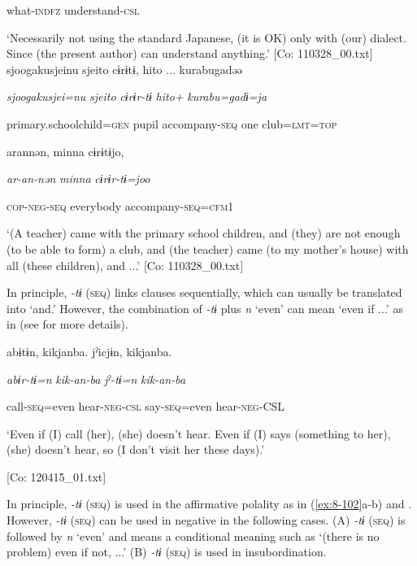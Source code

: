       what-\textsc{indfz}  understand-\textsc{csl}

\glt ‘Necessarily not using the standard Japanese, (it is OK) only with (our) dialect. Since (the present author) can understand anything.’ [Co: 110328\_00.txt]
\ex {\TM}
\glll  {\textbar}sjoogakusjei{\textbar}nu  {\textbar}sjeito{\textbar}  cɨrɨtɨ,  {\textbar}hito ...  kurabu{\textbar}gadəə

      \textit{sjoogakusjei=nu}  \textit{sjeito}  \textit{cɨrɨr-tɨ}  \textit{hito+}  \textit{kurabu=gadɨ=ja}

      primary.schoolchild=\textsc{gen}  pupil  accompany-\textsc{seq}  one  club=\textsc{lmt}=\textsc{top}

      arannən,  minna  cɨrɨtɨjo,

      \textit{ar-an-nən}  \textit{minna}  \textit{cɨrɨr-tɨ=joo}

      \textsc{cop}-\textsc{neg}-\textsc{seq}  everybody  accompany-\textsc{seq}=\textsc{cfm1}

\glt ‘(A teacher) came with the primary school children, and (they) are not enough (to be able to form) a club, and (the teacher) came (to my mother’s house) with all (these children), and ...’ [Co: 110328\_00.txt]
\z

In principle, \textit{{}-tɨ} (\textsc{seq}) links clauses sequentially, which can usually be translated into ‘and.’ However, the combination of \textit{{}-tɨ} plus \textit{n} ‘even’ can mean ‘even if ...’ as in  (see  for more details).

\ea\label{ex:8-103}
  {\TM}
\glll  abɨtɨn,  kikjanba.  jˀicjɨn,  kikjanba.

    \textit{abɨr-tɨ=n}  \textit{kik-an-ba}  \textit{jˀ-tɨ=n}  \textit{kik-an-ba}

    call-\textsc{seq}=even  hear-\textsc{neg}-\textsc{csl}  say-\textsc{seq}=even  hear-\textsc{neg}-CSL

    ‘Even if (I) call (her), (she) doesn’t hear. Even if (I) says (something to her), (she) doesn’t hear, so (I don’t visit her these days).’

    [Co: 120415\_01.txt]
\z

In principle, \textit{{}-tɨ} (\textsc{seq}) is used in the affirmative polality as in (\ref{ex:8-102}a-b) and . However, \textit{{}-tɨ} (\textsc{seq}) can be used in negative in the following cases. (A) \textit{{}-tɨ} (\textsc{seq}) is followed by \textit{n} ‘even’ and means a conditional meaning such as ‘(there is no problem) even if not, ...’ (B) \textit{{}-tɨ} (\textsc{seq}) is used in insubordination.

